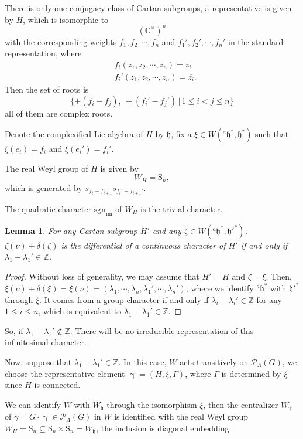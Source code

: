 \documentclass[12pt, a4paper]{amsart}
\numberwithin{equation}{section}
\newtheorem{lem}[thm]{Lemma}
\newcommand{\BC}{{\mathbb {C}}}
\newcommand{\BZ}{{\mathbb {Z}}}
\newcommand{\CP}{{\mathcal {P}}}
\newcommand{\fh}{\mathfrak{h}}
\newcommand{\sgn}{{\mathrm{sgn}}}
\newcommand{\set}[2]{\{#1\,|\,#2\}}
\renewcommand{\bar}{\overline}
\begin{document}
There is only one conjugacy class of Cartan subgroups, a representative is given by $H$, which is isomorphic to
$$(\BC^\times)^n$$
with the corresponding weights $f_1,f_2,\cdots,f_n$ and $f_1',f_2',\cdots,f_n'$ in the standard representation, where
\begin{align}
    & f_i(z_1,z_2,\cdots,z_n) = z_i\\
    & f_i'(z_1,z_2,\cdots,z_n) = \bar{z_i}.
\end{align}
Then the set of roots is 
$$\set{\pm(f_i - f_j), \ \pm(f_i'-f_j')}{1\leq i< j \leq n}$$
all of them are complex roots.

Denote the complexified Lie algebra of $H$ by $\fh$, fix a $\xi \in W({^{a}\fh^*},\fh^*)$ such that $\xi(e_i) = f_i$ and $\xi(e_i') = f_i'$.

The real Weyl group of $H$ is given by
$$W_H = \mathrm{S}_n,$$
which is generated by $s_{f_i-f_{i+1}}s_{f_i'-f_{i+1}'}$. 

The quadratic character $\sgn_{\mathrm{im}}$ of $W_{H}$ is the trivial character.

\begin{lem}
    For any Cartan subgroup $H'$ and any $\zeta \in W({^{a}\fh^*,\fh'^*})$, $\zeta(\nu) + \delta(\zeta)$ is the differential of a continuous character of $H'$ if and only if $\lambda_1 - \lambda_1' \in \BZ$.
\end{lem}

\begin{proof}
    Without loss of generality, we may assume that $H' = H$ and $\zeta = \xi$. Then, $\xi(\nu) + \delta(\xi) = \xi(\nu) = (\lambda_1,\cdots,\lambda_n,\lambda_1',\cdots,\lambda_n')$, where we identify ${^{a}\fh^*}$ with $\fh'^*$ through $\xi$. It comes from a group character if and only if $\lambda_i - \lambda_i' \in \BZ$ for any $1 \leq i \leq n$, which is equivalent to $\lambda_1 - \lambda_1' \in \BZ$.
\end{proof}


So, if $\lambda_1 - \lambda_1' \notin \BZ$. There will be no irreducible representation of this infinitesimal character.  

Now, suppose that $\lambda_1 - \lambda_1' \in \BZ$. In this case, $W$ acts transitively on $\CP_{\Lambda}(G)$, we choose the representative element $\upgamma = (H,\xi, \Gamma)$, where $\Gamma$ is determined by $\xi$ since $H$ is connected.

We can identify $W$ with $W_\fh$ through the isomorphism $\xi$, then the centralizer $W_{{\gamma}}$ of ${\gamma} = G \cdot \upgamma \in \CP_{\Lambda}(G)$ in $W$ is identified with the real Weyl group $W_{H} = \mathrm{S}_n \subseteq \mathrm{S}_n \times \mathrm{S}_n = W_{\fh}$, the inclusion is diagonal embedding.
\end{document}
